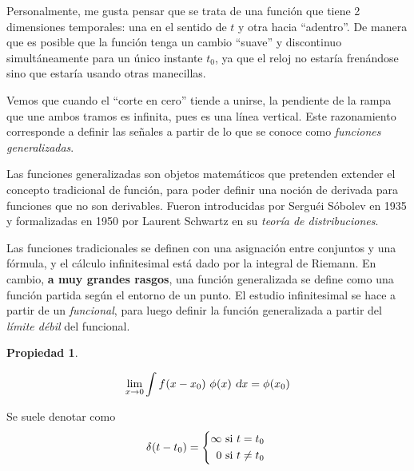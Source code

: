 \documentclass[a5paper,12pt,twoside]{book}
\newtheorem{prop}{{Propiedad}}[chapter]
\begin{document}
\begin{center}
    \def\svgwidth{0.6\linewidth}
    
\end{center}

Personalmente, me gusta pensar que se trata de una función que tiene 2 dimensiones temporales: una en el sentido de $t$ y otra hacia ``adentro''. De manera que es posible que la función tenga un cambio ``suave'' y discontinuo simultáneamente para un único instante $t_0$, ya que el reloj no estaría frenándose sino que estaría usando otras manecillas.

Vemos que cuando el ``corte en cero'' tiende a unirse, la pendiente de la rampa que une ambos tramos es infinita, pues es una línea vertical. Este razonamiento corresponde a definir las señales a partir de lo que se conoce como \emph{funciones generalizadas}.

Las funciones generalizadas son objetos matemáticos que pretenden extender el concepto tradicional de función, para poder definir una noción de derivada para funciones que no son derivables. Fueron introducidas por Serguéi Sóbolev en 1935 y formalizadas en 1950 por Laurent Schwartz en su \emph{teoría de distribuciones}.

Las funciones tradicionales se definen con una asignación entre conjuntos y una fórmula, y el cálculo infinitesimal está dado por la integral de Riemann. En cambio, \textbf{a muy grandes rasgos}, una función generalizada se define como una función partida según el entorno de un punto. El estudio infinitesimal se hace a partir de un \emph{funcional}, para luego definir la función generalizada a partir del \emph{límite débil} del funcional.

\begin{mdframed}[style=MyFrame1]
    \begin{prop}
        \label{prop:limDebil}
    \end{prop}
    \begin{equation*}
        \lim_{x \to 0} \int \fx{x-x_0} \, \fx[\phi]{x} \, \dif x = \fx[\phi]{x_0}
    \end{equation*}
\end{mdframed}



Se suele denotar como
\begin{equation*}
    \fx[\delta]{t-t_0} =
    \left\{
    \begin{aligned}
        \infty \text{ si $t=t_0$ }
        \\
        0 \text{ si $t \neq t_0$ }
    \end{aligned}
    \right.
\end{equation*}
\end{document}
